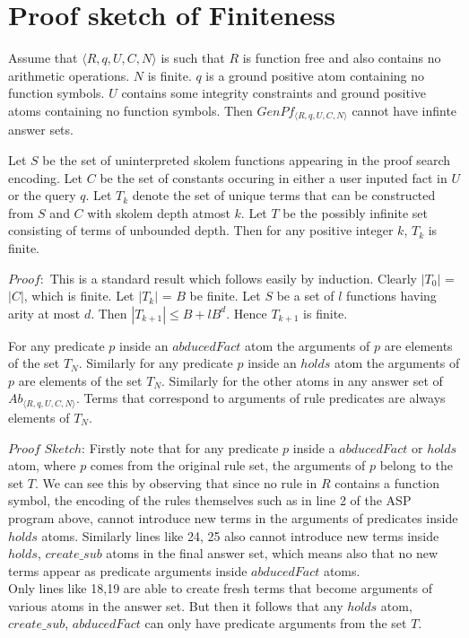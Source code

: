 \documentclass[sigconf]{acmart}
\begin{document}
\section{Proof sketch of Finiteness}\label{sec:proof_finiteness}
\begin{theorem}[Finiteness]\label{Finiteness}
Assume that $\langle R,q,U,C,N \rangle$ is such that $R$ is function free and also contains no arithmetic operations. $N$ is finite. $q$ is a ground positive atom containing no function symbols. $U$ contains some integrity constraints and ground positive atoms containing no function symbols. Then $GenPf_{\langle R,q,U,C,N \rangle}$ cannot have infinte answer sets. 
\end{theorem}
\begin{lemma}
Let $S$ be the set of uninterpreted skolem functions appearing in the proof search encoding. Let $C$ be the set of constants occuring in either a user inputed fact in $U$ or the query $q$. Let $T_{k}$ denote the set of unique terms that can be constructed from $S$ and $C$ with skolem depth atmost $k$. Let $T$ be the possibly infinite set consisting of terms of unbounded depth. Then for any positive integer $k$, $T_{k}$ is finite.
\end{lemma}

$Proof:$ This is a standard result which follows easily by induction. Clearly $|T_{0}|$ = $|C|$, which is finite. Let $|T_{k}|$ = $B$ be finite. Let $S$ be a set of $l$ functions having arity at most $d$. Then $|T_{k+1}|\leq B + lB^{d}$. Hence $T_{k+1}$ is finite.  

\begin{lemma}
 For any predicate $p$ inside an $abducedFact$ atom the arguments of $p$ are elements of the set $T_{N}$. Similarly for any predicate $p$ inside an $holds$ atom the arguments of $p$ are elements of the set $T_{N}$. Similarly for the other atoms in any answer set of $Ab_{\langle R,q,U,C,N \rangle}$. Terms that correspond to arguments of rule predicates are always elements of $T_{N}$.
\end{lemma}

$Proof$ $Sketch$: Firstly note that for any predicate $p$ inside a $abducedFact$ or $holds$ atom, where $p$ comes from the original rule set, the arguments of $p$ belong to the set $T$. We can see this by observing that since no rule in $R$ contains a function symbol, the encoding of the rules themselves such as in line 2 of the ASP program above, cannot introduce new terms in the arguments of predicates inside $holds$ atoms. Similarly lines like 24, 25 also cannot introduce new terms inside $holds$, $create\_sub$ atoms in the final answer set, which means also that no new terms appear as predicate arguments inside $abducedFact$ atoms. \\ Only lines like 18,19 are able to create fresh terms that become arguments of various atoms in the answer set. But then it follows that any $holds$ atom, $create\_sub$, $abducedFact$ can only have predicate arguments from the set $T$.    
\end{document}
